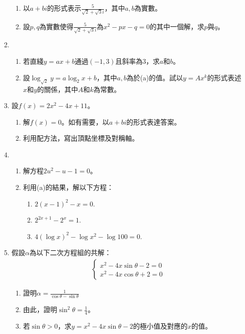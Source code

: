 \documentclass[12pt]{article}
\begin{document}
\begin{enumerate}
\begin{enumerate}
            \item 以$a+bi$的形式表示$\frac{5}{\sqrt{2}+\sqrt{3}i}$，其中$a,b$為實數。
            \item 設$p,q$為實數使得$\frac{5}{\sqrt{2}+\sqrt{3}i}$為$x^2-px-q=0$的其中一個解，求$p$與$q$。
        \end{enumerate}
        \item \begin{enumerate}
            \item 若直綫$y=ax+b$通過$(-1,3)$且斜率為$3$，求$a$和$b$。
            \item 設$\log_{\sqrt{2}}y=a\log_2{x}+b$，其中$a,b$為於(a)的值。試以$y=Ax^k$的形式表述$x$和$y$的關係，其中$A$和$k$為常數。
        \end{enumerate}
        \item 設$f(x)=2x^2-4x+11$。\begin{enumerate}
            \item 解$f(x)=0$。如有需要，以$a+bi$的形式表達答案。
            \item 利用配方法，寫出頂點坐標及對稱軸。
        \end{enumerate}
        \item \begin{enumerate}
            \item 解方程$2u^2-u-1=0$。
            \item 利用(a)的結果，解以下方程：\begin{enumerate}
                \item $2(x-1)^2-x=0$.
                \item $2^{2x+1}-2^x=1$.
                \item $4(\log{x})^2-\log{x^2}-\log{100}=0$.
            \end{enumerate}
        \end{enumerate}
        \item 假設$\alpha$為以下二次方程組的共解：\begin{align*}
            \begin{cases}
                x^2-4x\sin{\theta}-2=0\\
                x^2-4x\cos{\theta}+2=0
            \end{cases}
        \end{align*}\begin{enumerate}
            \item 證明$\alpha=\frac{1}{\cos{\theta}-\sin{\theta}}$
            \item 由此，證明$\sin^2{\theta}=\frac{1}{4}$。
            \item 若$\sin{\theta}>0$，求$y=x^2-4x\sin{\theta}-2$的極小值及對應的$x$的值。
        \end{enumerate}
    \end{enumerate}
\end{document}
